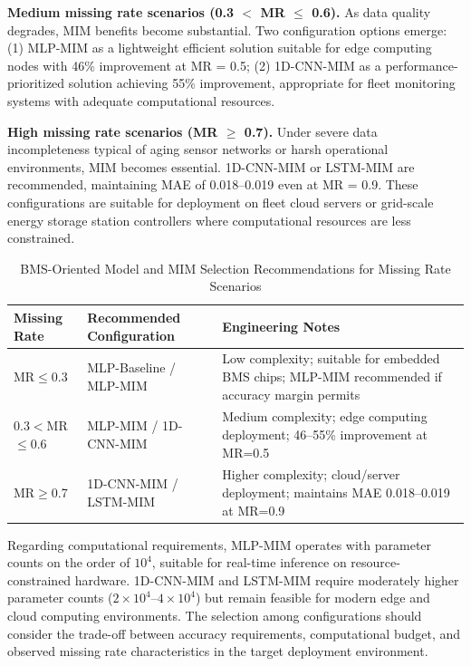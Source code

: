 \documentclass[5p,times]{elsarticle}
\begin{document}
\textbf{Medium missing rate scenarios (0.3 $<$ MR $\leq$ 0.6).} As data quality degrades, MIM benefits become substantial. Two configuration options emerge: (1) MLP-MIM as a lightweight efficient solution suitable for edge computing nodes with 46\% improvement at MR = 0.5; (2) 1D-CNN-MIM as a performance-prioritized solution achieving 55\% improvement, appropriate for fleet monitoring systems with adequate computational resources.

\textbf{High missing rate scenarios (MR $\geq$ 0.7).} Under severe data incompleteness typical of aging sensor networks or harsh operational environments, MIM becomes essential. 1D-CNN-MIM or LSTM-MIM are recommended, maintaining MAE of 0.018--0.019 even at MR = 0.9. These configurations are suitable for deployment on fleet cloud servers or grid-scale energy storage station controllers where computational resources are less constrained.

\begin{table}[t]
\centering
\small
\caption{BMS-Oriented Model and MIM Selection Recommendations for Missing Rate Scenarios}
\label{tab:bms_selection}
\begin{tabular}{@{}p{2.5cm}p{4cm}p{6cm}@{}}
\toprule
\textbf{Missing Rate} & \textbf{Recommended Configuration} & \textbf{Engineering Notes} \\
\midrule
MR$\leq$0.3 & MLP-Baseline / MLP-MIM & Low complexity; suitable for embedded BMS chips; MLP-MIM recommended if accuracy margin permits \\
\midrule
0.3$<$MR$\leq$0.6 & MLP-MIM / 1D-CNN-MIM & Medium complexity; edge computing deployment; 46--55\% improvement at MR=0.5 \\
\midrule
MR$\geq$0.7 & 1D-CNN-MIM / LSTM-MIM & Higher complexity; cloud/server deployment; maintains MAE 0.018--0.019 at MR=0.9 \\
\bottomrule
\end{tabular}
\end{table}

Regarding computational requirements, MLP-MIM operates with parameter counts on the order of $10^4$, suitable for real-time inference on resource-constrained hardware. 1D-CNN-MIM and LSTM-MIM require moderately higher parameter counts ($2\times10^4$--$4\times10^4$) but remain feasible for modern edge and cloud computing environments. The selection among configurations should consider the trade-off between accuracy requirements, computational budget, and observed missing rate characteristics in the target deployment environment.
\end{document}
